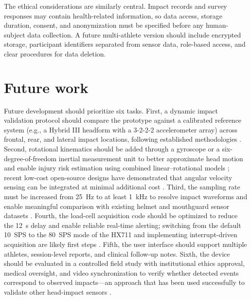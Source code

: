 \documentclass[11pt]{article}
\begin{document}
The ethical considerations are similarly central. Impact records and survey responses may contain health-related information, so data access, storage duration, consent, and anonymization must be specified before any human-subject data collection. A future multi-athlete version should include encrypted storage, participant identifiers separated from sensor data, role-based access, and clear procedures for data deletion.

\section{Future work}
Future development should prioritize six tasks. First, a dynamic impact validation protocol should compare the prototype against a calibrated reference system (e.g., a Hybrid III headform with a 3-2-2-2 accelerometer array) across frontal, rear, and lateral impact locations, following established methodologies \citep{bartsch2017modified,nocsae2024droptest}. Second, rotational kinematics should be added through a gyroscope or a six-degree-of-freedom inertial measurement unit to better approximate head motion and enable injury risk estimation using combined linear--rotational models \citep{rowson2013brain,cecchi2023rotational}; recent low-cost open-source designs have demonstrated that angular velocity sensing can be integrated at minimal additional cost \citep{ghazal2025opensource}. Third, the sampling rate must be increased from \SI{25}{Hz} to at least \SI{1}{kHz} to resolve impact waveforms and enable meaningful comparison with existing helmet and mouthguard sensor datasets \citep{king2017systematic,gabler2020onfield}. Fourth, the load-cell acquisition code should be optimized to reduce the \SI{12}{s} delay and enable reliable real-time alerting; switching from the default \SI{10}{SPS} to the \SI{80}{SPS} mode of the HX711 and implementing interrupt-driven acquisition are likely first steps \citep{hx711datasheet}. Fifth, the user interface should support multiple athletes, session-level reports, and clinical follow-up notes. Sixth, the device should be evaluated in a controlled field study with institutional ethics approval, medical oversight, and video synchronization to verify whether detected events correspond to observed impacts---an approach that has been used successfully to validate other head-impact sensors \citep{beckwith2020video,campolettano2020onfield}.
\end{document}
